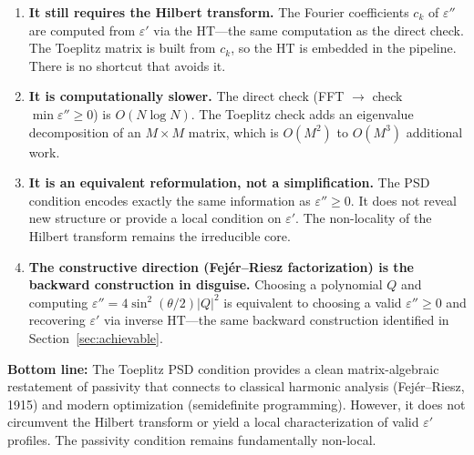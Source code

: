 \documentclass[11pt]{article}
\newcommand{\eps}{\varepsilon}
\begin{document}
\begin{enumerate}
\item \textbf{It still requires the Hilbert transform.}  The Fourier coefficients $c_k$ of $\eps''$ are computed from $\eps'$ via the HT---the same computation as the direct check.  The Toeplitz matrix is built from $c_k$, so the HT is embedded in the pipeline.  There is no shortcut that avoids it.

\item \textbf{It is computationally slower.}  The direct check (FFT $\to$ check $\min \eps'' \geq 0$) is $O(N \log N)$.  The Toeplitz check adds an eigenvalue decomposition of an $M \times M$ matrix, which is $O(M^2)$ to $O(M^3)$ additional work.

\item \textbf{It is an equivalent reformulation, not a simplification.}  The PSD condition encodes exactly the same information as $\eps'' \geq 0$.  It does not reveal new structure or provide a local condition on $\eps'$.  The non-locality of the Hilbert transform remains the irreducible core.

\item \textbf{The constructive direction (Fej\'er--Riesz factorization) is the backward construction in disguise.}  Choosing a polynomial $Q$ and computing $\eps'' = 4\sin^2(\theta/2)|Q|^2$ is equivalent to choosing a valid $\eps'' \geq 0$ and recovering $\eps'$ via inverse HT---the same backward construction identified in Section~\ref{sec:achievable}.
\end{enumerate}

\noindent\textbf{Bottom line:} The Toeplitz PSD condition provides a clean matrix-algebraic restatement of passivity that connects to classical harmonic analysis (Fej\'er--Riesz, 1915) and modern optimization (semidefinite programming).  However, it does not circumvent the Hilbert transform or yield a local characterization of valid $\eps'$ profiles.  The passivity condition remains fundamentally non-local.
\end{document}
